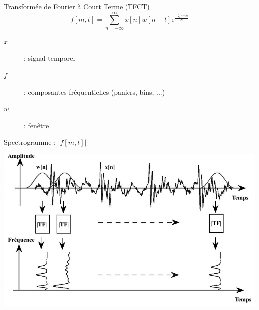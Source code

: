 \begin{frame}{Transformée de Fourier à Court Terme (TFCT)}
$$ f[m, t] = \sum_{n = - \infty}^{\infty} x[n] w[n-t] \mathrm{e}^{\frac{-2 \mathrm{j}  \pi m n}{N}} $$

\begin{description}
\item[$x$]: signal temporel
\item[$f$]: composantes fréquentielles (paniers, bins, ...)
\item[$w$]: fenêtre
\end{description}
\end{frame}

\begin{frame}{Spectrogramme : $|f[m, t]|$}
\begin{center}
\includegraphics[width=.8\columnwidth]{figures/tfct} \\
\end{center}
\end{frame}

